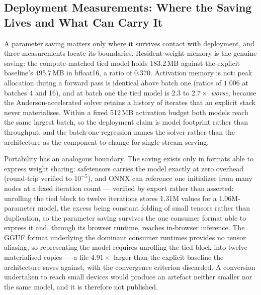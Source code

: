 \subsection{Deployment Measurements: Where the Saving Lives and What Can Carry It}
\label{sec:results:deployment}

A parameter saving matters only where it survives contact with deployment, and
three measurements locate its boundaries. Resident weight memory is the genuine
saving: the compute-matched tied model holds 183.2\,MB against the explicit
baseline's 495.7\,MB in bfloat16, a ratio of $0.370$. Activation memory is not:
peak allocation during a forward pass is identical above batch one (ratios of
$1.006$ at batches 4 and 16), and at batch one the tied model is $2.3$ to
$2.7\times$ \emph{worse}, because the Anderson-accelerated solver retains a
history of iterates that an explicit stack never materialises. Within a fixed
512\,MB activation budget both models reach the same largest batch, so the
deployment claim is model footprint rather than throughput, and the batch-one
regression names the solver rather than the architecture as the component to
change for single-stream serving.

Portability has an analogous boundary. The saving exists only in formats able to
express weight sharing: safetensors carries the model exactly at zero overhead
(round-trip verified to $10^{-5}$), and ONNX can reference one initializer from
many nodes at a fixed iteration count --- verified by export rather than
asserted: unrolling the tied block to twelve iterations stores 1.31M values for
a 1.06M-parameter model, the excess being constant folding of small tensors
rather than duplication, so the parameter saving survives the one consumer
format able to express it and, through its browser runtime, reaches in-browser
inference. The GGUF format underlying the dominant
consumer runtimes provides no tensor aliasing, so representing the model
requires unrolling the tied block into twelve materialised copies --- a file
$4.91\times$ larger than the explicit baseline the architecture saves against,
with the convergence criterion discarded. A conversion undertaken to reach small
devices would produce an artefact neither smaller nor the same model, and it is
therefore not published.

